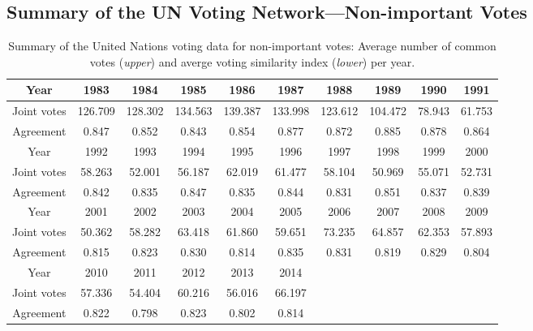 \documentclass[a4paper]{article}
\begin{document}
\begin{appendices}
\section{Summary of the UN Voting Network---Non-important Votes}\label{appendix: unimportantstat}
\begin{table}[ht]
	\centering
	\begin{tabular}{ |c|c|c|c|c|c|c|c|c|c|} 
		\hline
		{Year}	& 1983 & 1984& 1985& 1986 & 1987& 1988& 1989&1990&1991\\ \hline
		Joint votes & 126.709&128.302& 134.563& 139.387& 133.998& 123.612& 104.472&  78.943 & 61.753\\\hline
		Agreement & 0.847& 0.852&0.843& 0.854& 0.877&0.872& 0.885& 0.878&0.864\\\hline\hline 
		{Year}	& 1992&1993& 1994 & 1995& 1996& 1997 & 1998& 1999& 2000\\ \hline
		Joint votes  & 58.263&  52.001&  56.187& 62.019&  61.477&  58.104&  50.969&55.071 & 52.731\\\hline
		Agreement &0.842&0.835&0.847&0.835& 0.844& 0.831& 0.851&0.837& 0.839\\\hline\hline	
		{Year}	&2001&2002&2003&2004&2005& 2006& 2007& 2008&  2009\\ \hline
		Joint votes &  50.362& 58.282&  63.418&  61.860& 59.651& 73.235&64.857&62.353&  57.893\\\hline
		Agreement &0.815& 0.823&0.830& 0.814& 0.835& 0.831&0.819&0.829& 0.804\\
		\hline\hline	
		Year & 2010& 2011&2012&2013&2014&&&&\\\hline
		Joint votes& 57.336&  54.404& 60.216& 56.016&  66.197&&&&\\\hline
			Agreement&  0.822&0.798&0.823&0.802&0.814&&&&\\\hline
	\end{tabular}
	\caption {Summary of the United Nations voting data for non-important votes: Average number of common votes (\textit{upper}) and averge voting similarity index (\textit{lower}) per year.}
	\label{table:unimportant}
\end{table}



\end{appendices}
\end{document}
